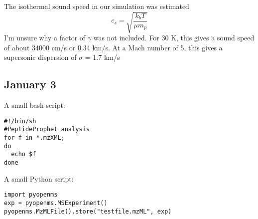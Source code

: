 \documentclass[12pt]{report}
\begin{document}
The isothermal sound speed in our simulation was estimated
\begin{equation}
c_s = \sqrt{\frac{k_b T}{\mu m_p}}
\end{equation}
I'm unsure why a factor of $\gamma$ was not included. For 30 K, this gives a sound speed of about 34000 cm/s or 0.34 km/s. At a Mach number of 5, this gives a supersonic dispersion of $\sigma$ = 1.7 km/s


\subsection{January 3}

A small bash script:

\begin{verbatim}
#!/bin/sh
#PeptideProphet analysis
for f in *.mzXML;
do
  echo $f  
done
\end{verbatim}

A small Python script:

\begin{verbatim}
import pyopenms
exp = pyopenms.MSExperiment()
pyopenms.MzMLFile().store("testfile.mzML", exp)
\end{verbatim}
\end{document}
